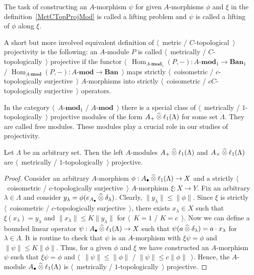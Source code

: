 The task of constructing an $A$-morphism $\psi$ for given $A$-morphisms $\phi$ 
and $\xi$ in the definition~\ref{MetCTopProjMod} is called a lifting problem 
and $\psi$ is called a lifting of $\phi$ along $\xi$.

A short but more involved equivalent definition 
of $\langle$~metric / $C$-topological~$\rangle$ projectivity is the following: 
an $A$-module $P$ is called $\langle$~metrically / $C$-topologically~$\rangle$ 
projective if the functor
$\langle$~$\operatorname{Hom}_{A\text{-}\mathbf{mod}_1}(P,-)
:A\text{-}\mathbf{mod}_1\to\mathbf{Ban}_1$
/
$\operatorname{Hom}_{A\text{-}\mathbf{mod}}(P,-)
:A\text{-}\mathbf{mod}\to\mathbf{Ban}$~$\rangle$
maps strictly $\langle$~coisometric / $c$-topologically surjective~$\rangle$
$A$-morphisms into strictly $\langle$~coisometric / 
$c C$-topologically surjective~$\rangle$ operators. 

In the category $\langle$~$A\text{-}\mathbf{mod}_1$ / $A\text{-}\mathbf{mod}$~$\rangle$ there
is a special class of $\langle$~metrically / $1$-topologically~$\rangle$
projective modules of the form $A_+\mathbin{\widehat{\otimes}} \ell_1(\Lambda)$ for 
some set $\Lambda$. They are called free modules. These modules play a crucial 
role in our studies of projectivity.

\begin{proposition}\label{MetCTopFreeMod} Let $\Lambda$ be an arbitrary 
set. Then the left $A$-modules $A_+ \mathbin{\widehat{\otimes}} \ell_1(\Lambda)$ 
and $A_\times \mathbin{\widehat{\otimes}} \ell_1(\Lambda)$ 
are $\langle$~metrically / $1$-topologically~$\rangle$ projective. 
\end{proposition}
\begin{proof}
Consider an arbitrary $A$-morphism 
$\phi:A_\bullet\mathbin{\widehat{\otimes}}\ell_1(\Lambda)\to X$ and a 
strictly $\langle$~coisometric / $c$-topologically surjective~$\rangle$ 
$A$-morphism $\xi:X\to Y$. Fix an arbitrary $\lambda\in\Lambda$ and 
consider $y_\lambda=\phi(e_{A_\bullet}\mathbin{\widehat{\otimes}} \delta_\lambda)$. 
Clearly, $\lVert y_\lambda\rVert\leq \lVert\phi\rVert$. Since $\xi$ is 
strictly $\langle$~coisometric / $c$-topologically surjective~$\rangle$, 
there exists $x_\lambda\in X$ such that $\xi(x_\lambda)=y_\lambda$
and $\lVert x_\lambda\rVert\leq K\lVert y_\lambda\rVert$ for $\langle$~$K=1$ / 
$K=c$~$\rangle$. Now we can define a bounded linear operator
$\psi:A_\bullet\mathbin{\widehat{\otimes}} \ell_1(\Lambda)\to X$ such that 
$\psi(a\mathbin{\widehat{\otimes}} \delta_\lambda)=a\cdot x_\lambda$ for $\lambda\in\Lambda$. 
It is routine to check that $\psi$ is an $A$-morphism with $\xi\psi=\phi$ 
and $\lVert\psi\rVert\leq K\lVert\phi\rVert$. Thus, for a given $\phi$ and $\xi$
we have constructed an $A$-morphism $\psi$ such that $\xi\psi=\phi$ and
$\langle$~$\lVert\psi\rVert\leq \lVert\phi\rVert$ / $\lVert\psi\rVert\leq
c\lVert\phi\rVert$~$\rangle$. Hence, the $A$-module $A_\bullet\mathbin{\widehat{\otimes}}
\ell_1(\Lambda)$ is $\langle$~metrically / $1$-topologically~$\rangle$
projective.
\end{proof}


